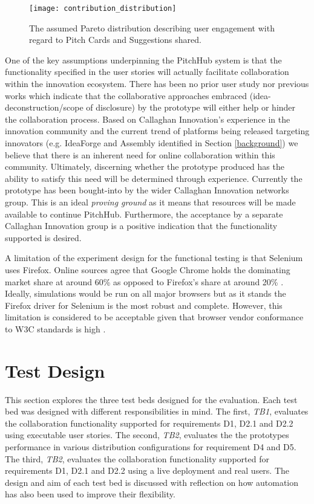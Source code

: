 \begin{figure}[ht]
    \centering
    \texttt{[image: contribution\_distribution]}
    \caption{The assumed Pareto distribution describing user engagement with regard to Pitch Cards and Suggestions shared.}
    \label{fig:contribution_distribution}
\end{figure}

One of the key assumptions underpinning the PitchHub system is that the functionality specified in the user stories will actually facilitate collaboration within the innovation ecosystem. There has been no prior user study nor previous works which indicate that the collaborative approaches embraced (idea-deconstruction/scope of disclosure) by the prototype will either help or hinder the collaboration process. Based on Callaghan Innovation's experience in the innovation community and the current trend of platforms being released targeting innovators (e.g. IdeaForge and Assembly identified in Section \ref{background}) we believe that there is an inherent need for online collaboration within this community. Ultimately, discerning whether the prototype produced has the ability to satisfy this need will be determined through experience. Currently the prototype has been bought-into by the wider Callaghan Innovation networks group. This is an ideal \textit{proving ground} as it means that resources will be made available to continue PitchHub. Furthermore, the acceptance by a separate Callaghan Innovation group is a positive indication that the functionality supported is desired.

A limitation of the experiment design for the functional testing is that Selenium uses Firefox. Online sources agree that Google Chrome holds the dominating market share at around 60\% as opposed to Firefox's share at around 20\% \cite{Brows6:online}. Ideally, simulations would be run on all major browsers but as it stands the Firefox driver for Selenium is the most robust and complete. However, this limitation is considered to be acceptable given that browser vendor conformance to W3C standards is high \cite{WebB1:online}.

\section{Test Design}
This section explores the three test beds designed for the evaluation. Each test bed was designed with different responsibilities in mind. The first, \textit{TB1}, evaluates the collaboration functionality supported for requirements D1, D2.1 and D2.2 using executable user stories. The second, \textit{TB2}, evaluates the the prototypes performance in various distribution configurations for requirement D4 and D5. The third, \textit{TB2}, evaluates the collaboration functionality supported for requirements D1, D2.1 and D2.2 using a live deployment and real users. The design and aim of each test bed is discussed with reflection on how automation has also been used to improve their flexibility.

